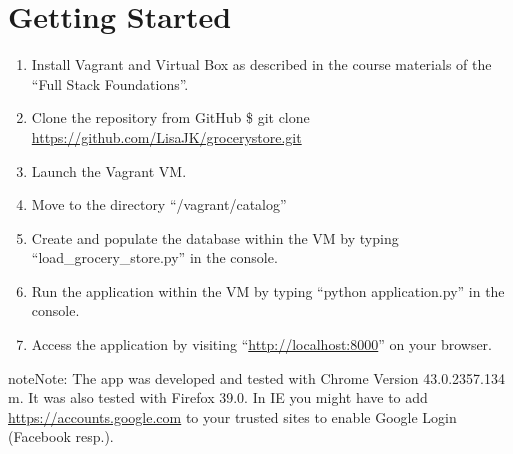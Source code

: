 \documentclass[letterpaper,10pt,english]{sphinxmanual}
\begin{document}
\chapter{Getting Started}
\label{index:getting-started}\begin{enumerate}
\item {} 
Install Vagrant and Virtual Box as described in the course materials of the
``Full Stack Foundations''.

\item {} 
Clone the repository from GitHub
\$ git clone \href{https://github.com/LisaJK/grocerystore.git}{https://github.com/LisaJK/grocerystore.git}

\item {} 
Launch the Vagrant VM.

\item {} 
Move to the directory ``/vagrant/catalog''

\item {} 
Create and populate the database within the VM by typing
``load\_grocery\_store.py'' in the console.

\item {} 
Run the application within the VM by typing ``python application.py'' in the
console.

\item {} 
Access the application by visiting ``\href{http://localhost:8000}{http://localhost:8000}'' on your browser.

\end{enumerate}

\begin{notice}{note}{Note:}
The app was developed and tested with Chrome Version 43.0.2357.134 m.
It was also tested with Firefox 39.0.
In IE you might have to add \href{https://accounts.google.com}{https://accounts.google.com} to your trusted sites
to enable Google Login (Facebook resp.).
\end{notice}
\end{document}
